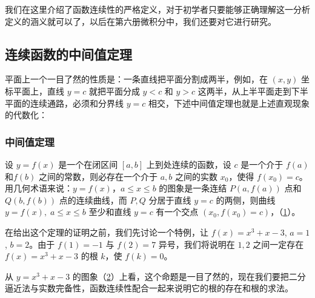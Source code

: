 我们在这里介绍了函数连续性的严格定义，对于初学者只要能够正确理解这一分析定义的涵义就可以了，以后在第六册微积分中，我们还要对它进行研究。

\subsection{连续函数的中间值定理}
平面上一个一目了然的性质是：一条直线把平面分割成两半，例如，在 $(x,y)$ 坐标平面上，直线 $y=c$ 就把平面分成 $y<c$ 和 $y>c$ 这两半，从上半平面走到下半平面的连续通路，必须和分界线 $y=c$ 相交，下述中间值定理也就是上述直观现象的代数化：

\subsubsection{中间值定理}

设 $y=f(x)$ 是一个在闭区间 $[a,b]$ 上到处连续的函数，设 $c$ 是一个介于 $f(a)$ 和$f(b)$ 之间的常数，则必存在一个介于 $a,b$ 之间的实数 $x_0$，使得 $f(x_0)=c$。用几何术语来说：$y=f(x)$，$a\leqslant x\leqslant b$ 的图象是一条连结 $P(a,f(a))$ 点和 $Q(b,f(b))$ 点的连续曲线，而 $P,Q$ 分居于直线 $y=c$ 的两侧，则曲线 $y=f(x),\; a\leqslant x\leqslant b$ 至少和直线 $y=c$ 有一个交点 $(x_0,f(x_0)=c)$，（\cref{fig:curve}）。

\begin{figure}
    \caption{}\label{fig:curve}
\end{figure}

在给出这个定理的证明之前，我们先讨论一个特例，让 $f(x)=x^3+x-3$, $a=1$, $b=2$。由于 $f(1)=-1$ 与 $f(2)=7$ 异号，我们将说明在 $1,2$ 之间一定存在 $f(x)=x^3+x-3$ 的根 $k$，使 $f(k)=0$。

从 $y=x^3+x-3$ 的图象（\cref{fig:cubic_curve}）上看，这个命题是一目了然的，现在我们要把二分逼近法与实数完备性，函数连续性配合一起来说明它的根的存在和根的求法。

\begin{figure}
    \caption{}\label{fig:cubic_curve}
\end{figure}


